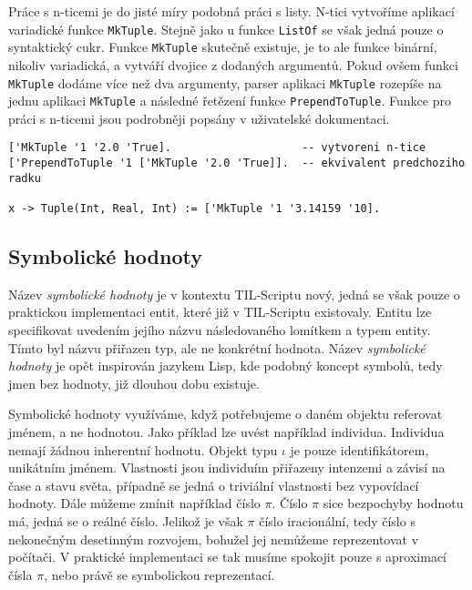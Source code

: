 Práce s n-ticemi je do jisté míry podobná práci s listy. N-tici vytvoříme aplikací variadické
funkce \lstinline{MkTuple}. Stejně jako u funkce \lstinline{ListOf} se však jedná pouze o
syntaktický cukr. Funkce \lstinline{MkTuple} skutečně existuje, je to ale funkce binární, nikoliv
variadická, a vytváří dvojice z dodaných argumentů. Pokud ovšem funkci \lstinline{MkTuple} dodáme
více než dva argumenty, parser aplikaci \lstinline{MkTuple} rozepíše na jednu aplikaci
\lstinline{MkTuple} a následné řetězení funkce \lstinline{PrependToTuple}. Funkce pro práci
s n-ticemi jsou podrobněji popsány v uživatelské dokumentaci.
 
\begin{lstlisting}[caption={Příklad využití n-tic}]
['MkTuple '1 '2.0 'True].                    -- vytvoreni n-tice
['PrependToTuple '1 ['MkTuple '2.0 'True]].  -- ekvivalent predchoziho radku

x -> Tuple(Int, Real, Int) := ['MkTuple '1 '3.14159 '10].
\end{lstlisting}

\subsection{Symbolické hodnoty} \label{symbolic-values}

Název \textit{symbolické hodnoty} je v kontextu TIL-Scriptu nový, jedná se však pouze o praktickou
implementaci entit, které již v TIL-Scriptu existovaly. Entitu lze specifikovat uvedením jejího
názvu následovaného lomítkem a typem entity. Tímto byl názvu přiřazen typ, ale ne konkrétní
hodnota. Název \textit{symbolické hodnoty} je opět inspirován jazykem Lisp, kde podobný koncept
symbolů, tedy jmen bez hodnoty, již dlouhou dobu existuje.

Symbolické hodnoty využíváme, když potřebujeme o daném objektu referovat jménem, a ne hodnotou.
Jako příklad lze uvést například individua. Individua nemají žádnou inherentní hodnotu. Objekt
typu $\iota$ je pouze identifikátorem, unikátním jménem. Vlastnosti jsou individuím přiřazeny
intenzemi a závisí na čase a stavu světa, případně se jedná o triviální vlastnosti bez vypovídací
hodnoty. Dále můžeme zmínit například číslo $\pi$. Číslo $\pi$ sice bezpochyby hodnotu má, jedná
se o reálné číslo. Jelikož je však $\pi$ číslo iracionální, tedy číslo s nekonečným desetinným
rozvojem, bohužel jej nemůžeme reprezentovat v počítači. V praktické implementaci se tak musíme
spokojit pouze s aproximací čísla $\pi$, nebo právě se symbolickou reprezentací.

